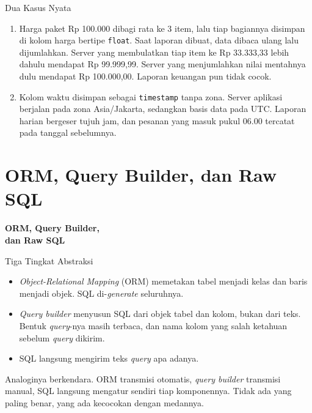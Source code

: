 \documentclass[aspectratio=169, table, 12pt]{beamer}
\begin{document}
\begin{frame}{{\Large Dua Kasus Nyata}}
  \vspace{10pt}
  \begin{enumerate}
    \item Harga paket Rp 100.000 dibagi rata ke 3 item, lalu tiap bagiannya
          disimpan di kolom harga bertipe \texttt{float}. Saat laporan dibuat,
          data dibaca ulang lalu dijumlahkan. Server yang membulatkan tiap item
          ke Rp 33.333,33 lebih dahulu mendapat Rp 99.999,99. Server yang
          menjumlahkan nilai mentahnya dulu mendapat Rp 100.000,00. Laporan
          keuangan pun tidak cocok.
    \item Kolom waktu disimpan sebagai \texttt{timestamp} tanpa zona. Server
          aplikasi berjalan pada zona Asia/Jakarta, sedangkan basis data pada
          UTC. Laporan harian bergeser tujuh jam, dan pesanan yang masuk pukul
          06.00 tercatat pada tanggal sebelumnya.
  \end{enumerate}
\end{frame}

\section{ORM, Query Builder, dan Raw SQL}

\begin{frame}{\hfill}
  \centering
  \Huge{\textbf{ORM, Query Builder,\\dan Raw SQL}}
\end{frame}

\begin{frame}{{\Large Tiga Tingkat Abstraksi}}
  \vspace{10pt}
  \begin{itemize}
    \item \textit{Object-Relational Mapping} (ORM) memetakan tabel menjadi
          kelas dan baris menjadi objek. SQL di-\textit{generate} seluruhnya.
    \item \textit{Query builder} menyusun SQL dari objek tabel dan kolom,
          bukan dari teks. Bentuk \textit{query}-nya masih terbaca, dan nama kolom yang
          salah ketahuan sebelum \textit{query} dikirim.
    \item SQL langsung mengirim teks \textit{query} apa adanya.
  \end{itemize}
  \vspace{10pt}
  {\footnotesize Analoginya berkendara. ORM transmisi otomatis, \textit{query
  builder} transmisi manual, SQL langsung mengatur sendiri tiap komponennya.
  Tidak ada yang paling benar, yang ada kecocokan dengan medannya.}
\end{frame}
\end{document}

